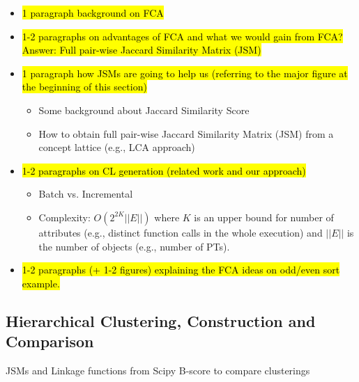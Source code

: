 \begin{itemize}
	\item \hl{1 paragraph background on FCA}
	\item \hl{1-2 paragraphs on advantages of FCA and what we would gain from FCA? Answer: Full pair-wise Jaccard Similarity Matrix (JSM)}
	\item \hl{1 paragraph how JSMs are going to help us (referring to the major figure at the beginning of this section)}
	\begin{itemize}
		\item Some background about Jaccard Similarity Score
		\item How to obtain full pair-wise Jaccard Similarity Matrix (JSM) from a concept lattice (e.g., LCA approach)
	\end{itemize}
	\item \hl{1-2 paragraphs on CL generation (related work and our approach)}
	\begin{itemize}
		\item Batch vs. Incremental \cite{clconst}
		\item Complexity: $O(2^{2K}||E||)$ where $K$ is an upper bound for number of attributes (e.g., distinct function calls in the whole execution) and $||E||$ is the number of objects (e.g., number of PTs).
	\end{itemize}
	\item \hl{1-2 paragraphs (+ 1-2 figures) explaining the FCA ideas on odd/even sort example.}
\end{itemize}


\subsection{Hierarchical Clustering, Construction and Comparison}
 \label{subsec:algo-bscore}
JSMs and Linkage functions from Scipy 
B-score to compare clusterings